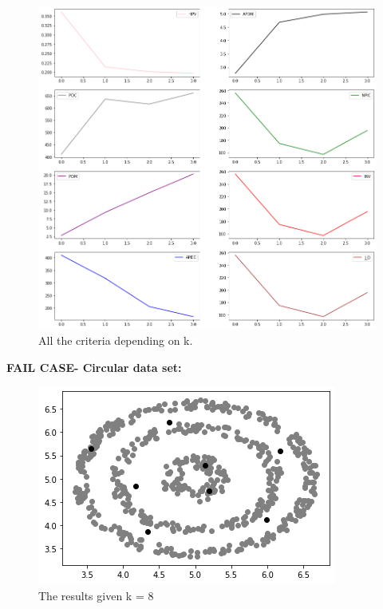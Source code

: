 \documentclass[12pt, a4paper]{paper}
\begin{document}
\begin{figure}[h!]
\centering
\includegraphics[scale=0.4]{plot_iris_2D_uofc.png}
\caption{All the criteria depending on k.}
\label{fig:Circular_3}
\end{figure}


\newpage


\textbf{FAIL CASE- Circular data set:}

\begin{figure}[h!]
\centering
\includegraphics[scale=0.5]{cir_uofc.png}
\caption{The results given k = 8}
\label{fig:Circular_3}
\end{figure}
\end{document}
